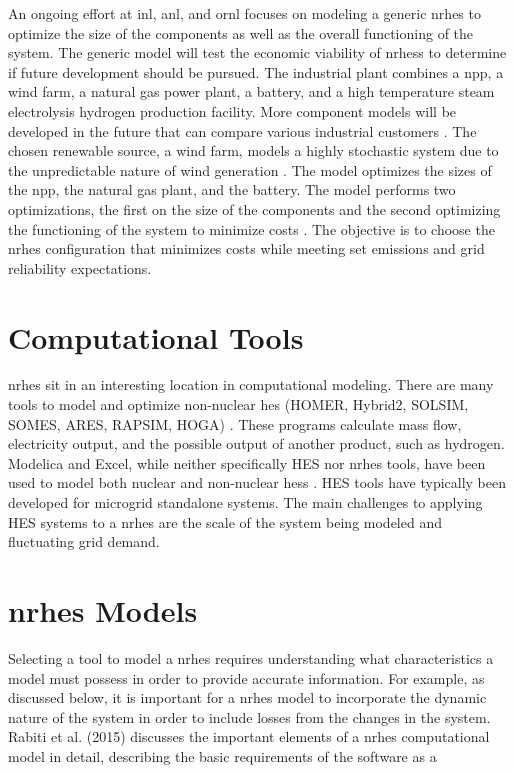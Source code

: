 An ongoing effort at \ac{inl}, \ac{anl}, and \ac{ornl} focuses on modeling a generic \ac{nrhes} to optimize the size of the components as well as the overall functioning of the system. The generic model will test the economic viability of \ac{nrhess} to determine if future development should be pursued. The industrial plant combines a \ac{npp}, a wind farm, a natural gas power plant, a battery, and a high temperature steam electrolysis hydrogen production facility. More component models will be developed in the future that can compare various industrial customers \cite{Harrison2016}. The chosen renewable source, a wind farm, models a highly stochastic system due to the unpredictable nature of wind generation \cite{Chen2016_wind}. The model optimizes the sizes of the \ac{npp}, the natural gas plant, and the battery. The model performs two optimizations, the first on the size of the components and the second optimizing the functioning of the system to minimize costs \cite{redfoot_rabiti_2018}. The objective is to choose the \ac{nrhes} configuration that minimizes costs while meeting set emissions and grid reliability expectations.

\section{Computational Tools}
\ac{nrhes} sit in an interesting location in computational modeling. There are many tools to model and optimize non-nuclear \ac{hes} (HOMER, Hybrid2, SOLSIM, SOMES, ARES, RAPSIM, HOGA) \cite {Bernal-Agustin2009}. These programs calculate mass flow, electricity output, and the possible output of another product, such as hydrogen. Modelica and Excel, while neither specifically HES nor \ac{nrhes} tools, have been used to model both nuclear and non-nuclear \ac{hes}s \cite{Shropshire2012, Chen2016, Binder2014, Garcia2015, Epiney2016}. HES tools have typically been developed for microgrid standalone systems. The main challenges to applying HES systems to a \ac{nrhes} are the scale of the system being modeled and fluctuating grid demand.

\section{\ac{nrhes} Models}
Selecting a tool to model a \ac{nrhes} requires understanding what characteristics a model must possess in order to provide accurate information. For example, as discussed below, it is important for a \ac{nrhes} model to incorporate the dynamic nature of the system in order to include losses from the changes in the system. Rabiti et al. (2015) discusses the important elements of a \ac{nrhes} computational model in detail, describing the basic requirements of the software as a

